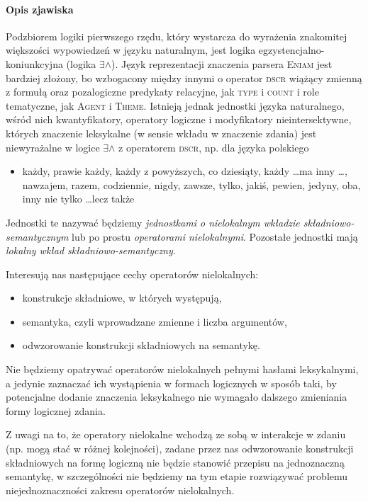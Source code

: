 \documentclass[12pt]{mwart}
\theoremstyle{remark}
\newcommand{\eniam}{\textsc{Eniam}}
\newcommand{\agent}{\textsc{Agent}}
\newcommand{\theme}{\textsc{Theme}}
\begin{document}
\paragraph{Opis zjawiska} %
\label{sub:definicja_robocza1}


Podzbiorem logiki pierwszego rzędu, który wystarcza do wyrażenia znakomitej większości wypowiedzeń w języku naturalnym, jest logika egzystencjalno-koniunkcyjna (logika $\exists\wedge$). Język reprezentacji znaczenia parsera \eniam{} jest bardziej złożony, bo wzbogacony między innymi o operator \textsc{dscr} wiążący zmienną z formułą oraz pozalogiczne predykaty relacyjne, jak \textsc{type} i \textsc{count} i role tematyczne, jak \agent{} i \theme{}. Istnieją jednak jednostki języka naturalnego, wśród nich kwantyfikatory, operatory logiczne i modyfikatory nieintersektywne, których znaczenie leksykalne (w sensie wkładu w znaczenie zdania) jest niewyrażalne w logice $\exists\wedge$ z operatorem \textsc{dscr}, np. dla języka polskiego
\begin{itemize}
	\item każdy, prawie każdy, każdy z powyższych, co dziesiąty, 
każdy \dots ma inny \dots, nawzajem, razem,
codziennie, nigdy, zawsze, tylko, jakiś, pewien, jedyny, oba, inny
nie tylko \dots lecz także
\end{itemize}
Jednostki te nazywać będziemy \emph{jednostkami o nielokalnym wkładzie składniowo-semantycznym} lub po prostu \emph{operatorami nielokalnymi}. Pozostałe jednostki mają \emph{lokalny wkład składniowo-semantyczny}.

Interesują nas następujące cechy operatorów nielokalnych:
\begin{itemize}
\item konstrukcje składniowe, w których występują,
\item semantyka, czyli wprowadzane zmienne i liczba argumentów, 
\item odwzorowanie konstrukcji składniowych na semantykę.
\end{itemize}
Nie będziemy opatrywać operatorów nielokalnych pełnymi hasłami leksykalnymi, a jedynie zaznaczać ich wystąpienia w formach logicznych
w sposób taki, by potencjalne dodanie znaczenia leksykalnego nie wymagało dalszego zmieniania formy logicznej zdania.

Z uwagi na to, że operatory nielokalne wchodzą ze sobą w interakcje w zdaniu (np. mogą stać w różnej kolejności),
zadane przez nas odwzorowanie konstrukcji składniowych na formę logiczną nie będzie stanowić przepisu na jednoznaczną semantykę,
w szczególności nie będziemy na tym etapie rozwiązywać problemu niejednoznaczności zakresu operatorów nielokalnych.
\end{document}
